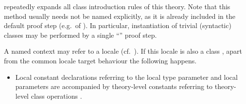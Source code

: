 \begin{isabellebody}
\begin{isamarkuptext}
\begin{description}
  \item \hyperlink{method.intro-classes}{\mbox{}} repeatedly expands all class
  introduction rules of this theory.  Note that this method usually
  needs not be named explicitly, as it is already included in the
  default proof step (e.g.\ of \hyperlink{command.proof}{\mbox{}}).  In particular,
  instantiation of trivial (syntactic) classes may be performed by a
  single ``\hyperlink{command.ddot}{\mbox{}}'' proof step.

  \end{description}%
\end{isamarkuptext}%
\isamarkuptrue%
%
\isamarkuptrue%
%
\begin{isamarkuptext}%

  A named context may refer to a locale (cf.\ ).
  If this locale is also a class , apart from the common
  locale target behaviour the following happens.

  \begin{itemize}

  \item Local constant declarations  referring to the
  local type parameter  and local parameters 
  are accompanied by theory-level constants 
  referring to theory-level class operations .


\end{itemize}
\end{isamarkuptext}
\end{isabellebody}
